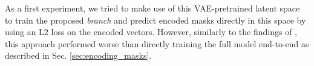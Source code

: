 As a first experiment, we tried to make use of this VAE-pretrained latent space to train the proposed \emph{\encBr branch} and predict encoded masks directly in this space by using an L2 loss on the encoded vectors. However, similarly to the findings of \cite{hirsch2020patchperpix}, this approach performed worse than directly training the full model end-to-end as described in Sec. \ref{sec:encoding_masks}. 



